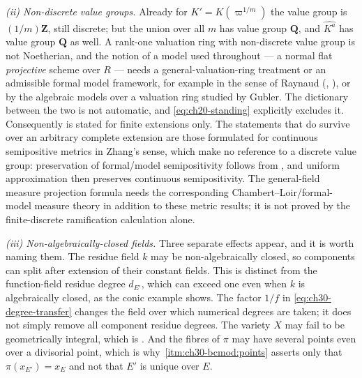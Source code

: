 \emph{(ii) Non-discrete value groups.}  Already for $K'=K(\varpi^{1/m})$
the value group is $(1/m)\mathbf Z$, still discrete; but the union over
all $m$ has value group $\mathbf Q$, and $\widehat{K^{a}}$ has value
group $\mathbf Q$ as well.  A rank-one valuation ring with non-discrete
value group is not Noetherian, and the notion of a model used throughout
 --- a normal flat \emph{projective} scheme over $R$ ---
needs a general-valuation-ring treatment or an admissible formal
model framework, for example in the sense of Raynaud
(\cite{BoschLutkebohmert1993}, \cite{RaynaudGruson1971}), or by the
algebraic models over a valuation ring studied by Gubler.  The dictionary
between the two is not automatic, and \eqref{eq:ch20-standing} explicitly
excludes it.  Consequently
 is stated for finite extensions only.  The
statements that do survive over an arbitrary complete extension are those
formulated for continuous semipositive metrics in Zhang's sense, which make
no reference to a discrete value group: preservation of formal/model semipositivity follows from
\cite[Proposition~2.18(a) and Lemma~3.3]{GM19}, and uniform approximation
then preserves continuous semipositivity.  The general-field measure
projection formula needs the corresponding Chambert--Loir/formal-model
measure theory in addition to these metric results; it is not proved by
the finite-discrete ramification calculation alone.

\emph{(iii) Non-algebraically-closed fields.}  Three separate effects
appear, and it is worth naming them.  The residue field $k$ may be non-algebraically closed, so components
can split after extension of their constant fields.  This is distinct
from the function-field residue degree $d_{E'}$, which can exceed one
even when $k$ is algebraically closed, as the conic example shows.
The factor $1/f$ in \eqref{eq:ch30-degree-transfer} changes the field
over which numerical degrees are taken; it does not simply remove all
component residue degrees.  The
variety $X$ may fail to be geometrically integral, which is
.  And the fibres of $\pi$ may
have several points even over a divisorial point, which is why
\,\cref{itm:ch30-bcmod:points} asserts only
that $\pi(x_{E'})=x_E$ and not that $E'$ is unique over $E$.


